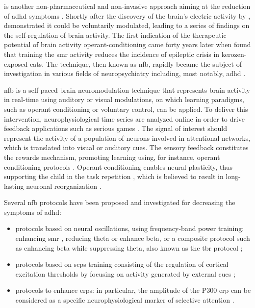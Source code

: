  is another non-pharmaceutical and non-invasive approach aiming at the reduction of \gls{adhd} symptoms 
\citep{Arns2015, Steffert2010, Marzbani2016}. Shortly after the discovery of the brain's electric activity by 
\citet{Berger1929}, \citet{Durup1935} demonstrated it could be voluntarily modulated, leading to a series of findings on the 
self-regulation of brain activity. The first indication of the therapeutic potential of brain activity operant-conditioning 
came forty years later when \citet{Sterman1974} found that training the \gls{smr} activity reduces the incidence 
of epileptic crisis in kerozen-exposed cats. The technique, then known as \gls{nfb}, rapidly became the subject of investigation in various 
fields of neuropsychiatry including, most notably, \gls{adhd} \citep{Lubar1976, Rossiter1995, Linden1996, Maurizio2014}.

\Gls{nfb} is a self-paced brain neuromodulation technique that represents brain activity in real-time using auditory 
or visual modulations, on which learning paradigms, such as operant conditioning
\citep{Reynolds1975} or voluntary control, can be applied. To deliver this intervention, neurophysiological time series 
are analyzed online in order to drive feedback applications such as serious games \citep{Wang2010}. 
The signal of interest should represent the activity of a population of neurons involved in attentional networks, which is translated into 
visual or auditory cues. The sensory feedback constitutes the rewards mechanism, promoting learning using, for instance, operant conditioning 
protocols \citep{Sherlin2011}. Operant conditioning enables neural plasticity, thus supporting the child in the task repetition \citep{Skinner1961}, 
which is believed to result in long-lasting neuronal reorganization \citep{VanDoren2017}. 

Several \gls{nfb} protocols have been proposed and investigated for decreasing the symptoms of \gls{adhd}:
\begin{itemize} 
  \item protocols based on neural oscillations, using frequency-band power training: enhancing \gls{smr} \citep{Beauregard2006}, reducing theta 
	  or enhance beta, or a composite protocol such as enhancing beta while suppressing theta, also known as the \gls{tbr}
    protocol \citep{Lubar1976, Arns2013}; 
  \item protocols based on \glspl{scp} training consisting of the regulation of
    cortical excitation thresholds by focusing on activity generated by external cues 
    \citep{Heinrich2004, Banaschewski2007}; 
  \item protocols to enhance \glspl{erp}: in particular, the amplitude of the P300 \gls{erp} can be considered as a specific
    neurophysiological marker of selective attention \citep{Fouillen2017}.  
\end{itemize} 


